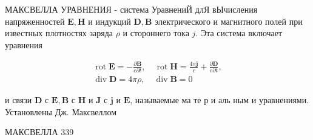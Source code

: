 \documentclass[10pt]{article}
\begin{document}
МАКСВЕЛЛА УРАВНЕНИЯ - система УравнениЙ длЯ вЫчисления напряженностей $\boldsymbol{E}, \boldsymbol{H}$ и индукций $\boldsymbol{D}, \boldsymbol{B}$ электрического и магнитного полей при известных плотностях заряда $\rho$ и стороннего тока $j$. Эта система включает уравнения



\[

\begin{gathered}

\operatorname{rot} \boldsymbol{E}=-\frac{\partial \boldsymbol{B}}{c \partial t}, \quad \operatorname{rot} \boldsymbol{H}=\frac{4 \pi \boldsymbol{j}}{c}+\frac{\partial \boldsymbol{D}}{c \partial t}, \\

\operatorname{div} \boldsymbol{D}=4 \pi \rho, \quad \operatorname{div} \boldsymbol{B}=0

\end{gathered}

\]



и связи $\boldsymbol{D}$ с $\boldsymbol{E}, \boldsymbol{B}$ с $\boldsymbol{H}$ и $\boldsymbol{J}$ с $\boldsymbol{j}$ и $\boldsymbol{E}$, называемые ма те р и аль ным и уравнениями. Установлены Дж. Максвеллом



МАКСВЕЛЛА 339
\end{document}
